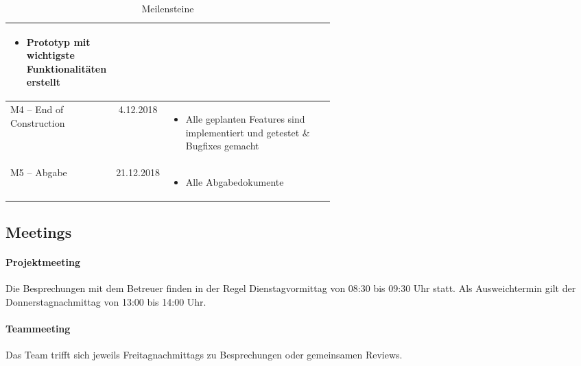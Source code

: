 \begin{table}[H]
\begin{tabular}{|l|c|p{0.55\linewidth}|}
        \begin{itemize}
            \setlength\itemsep{0mm}
            \item Prototyp mit wichtigste Funktionalitäten erstellt
            \vspace{-\topsep}
        \end{itemize} \\ \hline
        M4 – End of Construction & 4.12.2018 &
        \vspace{-7mm}
        \begin{itemize}
            \setlength\itemsep{0mm}
            \item Alle geplanten Features sind implementiert und getestet \& Bugfixes gemacht
            \vspace{-\topsep}
        \end{itemize} \\ \hline
        M5 – Abgabe & 21.12.2018 & 
        \vspace{-7mm}
        \begin{itemize}
            \setlength\itemsep{0mm}
            \item Alle Abgabedokumente
            \vspace{-\topsep}
        \end{itemize} \\ \hline

    \end{tabular}
    \caption{Meilensteine}
\end{table}


\subsection{Meetings}
\paragraph{Projektmeeting}
Die Besprechungen mit dem Betreuer finden in der Regel Dienstagvormittag von 08:30 bis 09:30 Uhr statt. Als Ausweichtermin gilt der Donnerstagnachmittag von 13:00 bis 14:00 Uhr.
\paragraph{Teammeeting}
Das Team trifft sich jeweils Freitagnachmittags zu Besprechungen oder gemeinsamen Reviews.